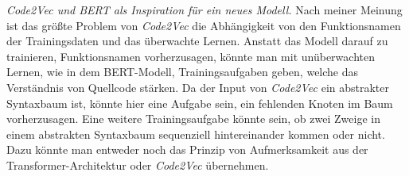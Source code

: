 \documentclass[12pt,letterpaper,ngerman]{article}
\begin{document}
\textit{Code2Vec und BERT als Inspiration für ein neues Modell.} 
Nach meiner Meinung ist das größte Problem von \textit{Code2Vec} 
die Abhängigkeit von den Funktionsnamen der Trainingsdaten und 
das überwachte Lernen. Anstatt das Modell darauf zu trainieren,
Funktionsnamen vorherzusagen, könnte man mit unüberwachten Lernen,
wie in dem BERT-Modell, Trainingsaufgaben geben, welche das 
Verständnis von Quellcode stärken. Da der Input von 
\textit{Code2Vec} ein abstrakter Syntaxbaum ist, könnte hier eine 
Aufgabe sein, ein fehlenden Knoten im Baum vorherzusagen. Eine 
weitere Trainingsaufgabe könnte sein, ob zwei Zweige in 
einem abstrakten Syntaxbaum sequenziell hintereinander kommen oder 
nicht. Dazu könnte man entweder noch das Prinzip von Aufmerksamkeit
aus der Transformer-Architektur oder \textit{Code2Vec} übernehmen.
\pagebreak
\end{document}

